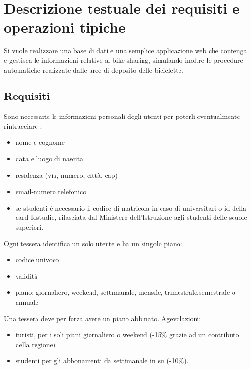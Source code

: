 \documentclass[a4paper,twoside]{article}
\begin{document}
\section{Descrizione testuale dei requisiti e operazioni tipiche}
Si vuole realizzare una base di dati e una semplice applicazione web che contenga e gestisca le informazioni relative al
bike sharing, simulando inoltre le procedure automatiche realizzate dalle aree di deposito delle biciclette.


\subsection{Requisiti}
Sono necessarie le informazioni personali degli utenti per poterli eventualmente rintracciare :
\begin{itemize}
 \item nome e cognome
 \item data e luogo di nascita
 \item residenza (via, numero, città, cap)
 \item email-numero telefonico
 \item se studenti è necessario il codice di matricola in caso di universitari o id della card Iostudio, rilasciata dal Ministero dell'Istruzione agli studenti delle scuole superiori. 
\end{itemize}
Ogni tessera identifica un solo utente e ha un singolo piano:
\begin{itemize}%
 \item codice univoco
 \item validità
 \item piano: giornaliero, weekend, settimanale, mensile, trimestrale,semestrale o annuale
\end{itemize}
Una tessera deve per forza avere un piano abbinato.\newline
Agevolazioni:
\begin{itemize}
 \item turisti, per i soli piani giornaliero o weekend (-15\% grazie ad un contributo della regione)
 \item studenti per gli abbonamenti da settimanale in su (-10\%).
\end{itemize}
\end{document}
